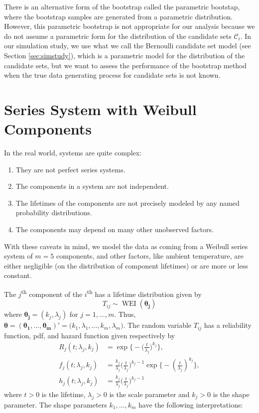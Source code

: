 \documentclass[
]{article}
\begin{document}
There is an alternative form of the bootstrap called the parametric
bootstap, where the bootstrap samples are generated from a parametric
distribution. However, this parametric bootstrap is not appropriate for
our analysis because we do not assume a parametric form for the
distribution of the candidate sets \(\mathcal{C}_i\). In our simulation
study, we use what we call the Bernoulli candidate set model (see
Section \ref{sec:simstudy}), which is a parametric model for the
distribution of the candidate sets, but we want to assess the
performance of the bootstrap method when the true data generating
process for candidate sets is not known.

\hypertarget{sec:weibull}{%
\section{Series System with Weibull Components}\label{sec:weibull}}

In the real world, systems are quite complex:

\begin{enumerate}
\def\labelenumi{\arabic{enumi}.}
\item
  They are not perfect series systems.
\item
  The components in a system are not independent.
\item
  The lifetimes of the components are not precisely modeled by any named
  probability distributions.
\item
  The components may depend on many other unobserved factors.
\end{enumerate}

With these caveats in mind, we model the data as coming from a Weibull
series system of \(m = 5\) components, and other factors, like ambient
temperature, are either negligible (on the distribution of component
lifetimes) or are more or less constant.

The \(j\)\textsuperscript{th} component of the \(i\)\textsuperscript{th}
has a lifetime distribution given by \[
    T_{i j} \sim \operatorname{WEI}(\boldsymbol{\theta_j})
\] where \(\boldsymbol{\theta_j} = (k_j, \lambda_j)\) for
\(j=1,\ldots,m\). Thus,
\(\boldsymbol{\theta }= (\boldsymbol{\theta_1},\ldots,\boldsymbol{\theta_m})' = \bigl(k_1,\lambda_1,\ldots,k_m,\lambda_m\bigr)\).
The random variable \(T_{i j}\) has a reliability function, pdf, and
hazard function given respectively by \begin{align}
    R_j(t;\lambda_j,k_j)
        &= \exp\biggl\{-\biggl(\frac{t}{\lambda_j}\biggr)^{k_j}\biggr\},\\
    f_j(t;\lambda_j,k_j)
        &= \frac{k_j}{\lambda_j}\biggl(\frac{t}{\lambda_j}\biggr)^{k_j-1}
        \exp\biggl\{-\left(\frac{t}{\lambda_j}\right)^{k_j} \biggr\},\\
    h_j(t;\lambda_j,k_j) \label{eq:weibull_haz}
        &= \frac{k_j}{\lambda_j}\biggl(\frac{t}{\lambda_j}\biggr)^{k_j-1}
\end{align} where \(t > 0\) is the lifetime, \(\lambda_j > 0\) is the
scale parameter and \(k_j > 0\) is the shape parameter. The shape
parameters \(k_1, \ldots, k_m\) have the following interpretations:
\end{document}
